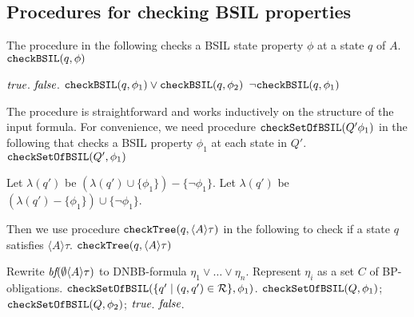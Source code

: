 \subsection{Procedures for checking BSIL properties\label{subsec.alg.proc}}

The procedure in the following 
checks a BSIL state property $\phi$ at a state $q$ of $A$.
\procbegin
$\mbox{\tt checkBSIL}(q,\phi)$
\begin{algorithmic}[1]
\label{st.dfstest.cover}
    \RETLINE $\mbox{\em true}$.
  \ELSELINE
    \RETLINE $\mbox{\em false}$.
  \ENDIFLINE
{}
  \RETLINE $\mbox{\tt checkBSIL}(q,\phi_1)
    \vee\mbox{\tt checkBSIL}(q,\phi_2)$
  \RETLINE $\neg\mbox{\tt checkBSIL}(q,\phi_1)$
\ENDIFNLINE
\end{algorithmic}
\procend
The procedure is straightforward and works inductively on the structure
of the input formula.
For convenience, we need procedure $\mbox{\tt checkSetOfBSIL}(Q'\phi_1)$
in the following  
that
checks a BSIL property $\phi_1$ at each state in $Q'$.
\procbegin
$\mbox{\tt checkSetOfBSIL}(Q',\phi_1)$
\begin{algorithmic}[1]
      Let $\lambda(q')$ be $(\lambda(q')\cup\{\phi_1\})-\{\neg\phi_1\}$.
    \ELSNLINE 
      Let $\lambda(q')$ be $(\lambda(q')-\{\phi_1\})\cup\{\neg\phi_1\}$.
    \ENDIFLINE 
  \ENDFOR
\ENDIF
\end{algorithmic}
\procend
Then we use procedure $\mbox{\tt checkTree}(q,\langle A\rangle\tau)$ in the following 
to check if a state $q$ satisfies $\langle A\rangle\tau$.
\procbegin
$\mbox{\tt checkTree}(q,\langle A\rangle\tau)$
\begin{algorithmic}[1]
\STATE \label{stmt.syntree.dqnf}
    Rewrite $\textit{bf}(\emptyset\langle A\rangle\tau)$ 
    to DNBB-formula $\eta_1\vee\ldots\vee\eta_n$.
 \label{stmt.syntree.loop.conj}
  \STATE Represent $\eta_i$ as a set $C$ of BP-obligations.
    \label{stmt.syntree.loop.sint}
    \label{stmt.syntree.loop.sub}
      $\mbox{\tt checkSetOfBSIL}(\{q'\mid (q,q')\in {\cal R}\},\phi_1)$.
      $\mbox{\tt checkSetOfBSIL}(Q,\phi_1)$;
      $\mbox{\tt checkSetOfBSIL}(Q,\phi_2)$; 
    \ENDIFLINE 
  \ENDFOR
  \label{stmt.syntree.tree.explore}
    \RETLINE $\mbox{\em true}$.
  \ENDIFLINE
\ENDFOR
\RETURN $\mbox{\em false}$.
\end{algorithmic}
